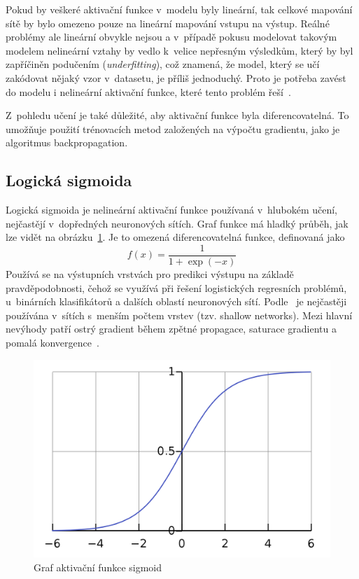 Pokud by veškeré aktivační funkce v~modelu byly lineární, tak celkové mapování sítě by bylo omezeno pouze na lineární mapování vstupu na výstup. Reálné problémy ale lineární obvykle nejsou a v~případě pokusu modelovat takovým modelem nelineární vztahy by vedlo k~velice nepřesným výsledkům, který by byl zapříčiněn podučením (\textit{underfitting}), což znamená, že model, který se učí zakódovat nějaký vzor v~datasetu, je příliš jednoduchý. Proto je potřeba zavést do modelu i nelineární aktivační funkce, které tento problém řeší~\cite{mitdeeplearning_small}.

Z~pohledu učení je také důležité, aby aktivační funkce byla diferencovatelná. To umožňuje použití trénovacích metod založených na výpočtu gradientu, jako je algoritmus backpropagation.



\subsection*{Logická sigmoida}
Logická sigmoida je nelineární aktivační funkce používaná v~hlubokém učení, nejčastějí v~dopředných neuronových sítích. Graf funkce má hladký průběh, jak lze vidět na obrázku~\ref{fig:sigmoid}. Je to omezená diferencovatelná funkce, definovaná jako
\begin{equation}
  f(x) = \frac{1}{1+\exp(-x)}
\end{equation}
Používá se na výstupních vrstvách pro predikci výstupu na základě pravděpodobnosti, čehož se využívá při řešení logistických regresních problémů, u~binárních klasifikátorů a dalších oblastí neuronových sítí. Podle~\cite{NEAL199271} je nejčastěji používána v~sítích s~menším počtem vrstev (tzv. shallow networks). Mezi hlavní nevýhody patří ostrý gradient během zpětné propagace, saturace gradientu a pomalá konvergence~\cite{nwankpa2018activation}.

\begin{figure}[H]
    \centering
    \includegraphics[scale=0.18]{obrazky-figures/sigmoid.png}
    \caption{\label{fig:sigmoid}Graf aktivační funkce sigmoid}
\end{figure}



